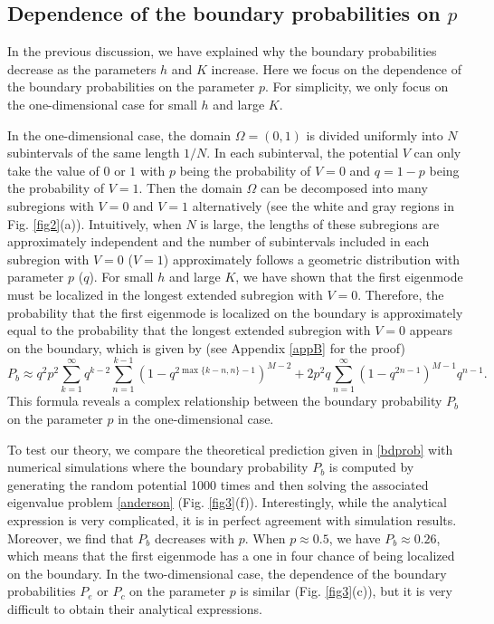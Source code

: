 \documentclass[a4paper,11pt]{article}
\begin{document}
\subsection{Dependence of the boundary probabilities on $p$}
In the previous discussion, we have explained why the boundary probabilities decrease as the parameters $h$ and $K$ increase. Here we focus on the dependence of the boundary probabilities on the parameter $p$. For simplicity, we only focus on the one-dimensional case for small $h$ and large $K$.

In the one-dimensional case, the domain $\Omega = (0, 1)$ is divided uniformly into $N$ subintervals of the same length $1/N$. In each subinterval, the potential $V$ can only take the value of $0$ or $1$ with $p$ being the probability of $V = 0$ and $q = 1-p$ being the probability of $V = 1$. Then the domain $\Omega$ can be decomposed into many subregions with $V = 0$ and $V = 1$ alternatively (see the white and gray regions in Fig. \ref{fig2}(a)). Intuitively, when $N$ is large, the lengths of these subregions are approximately independent and the number of subintervals included in each subregion with $V = 0$ ($V = 1$) approximately follows a geometric distribution with parameter $p$ ($q$). For small $h$ and large $K$, we have shown that the first eigenmode must be localized in the longest extended subregion with $V = 0$. Therefore, the probability that the first eigenmode is localized on the boundary is approximately equal to the probability that the longest extended subregion with $V = 0$ appears on the boundary, which is given by (see Appendix \ref{appB} for the proof)
\begin{equation}\label{bdprob}
P_b \approx q^2 p^2 \sum_{k=1}^{\infty} q^{k-2} \sum_{n=1}^{k-1} (1 - q^{2 \max\{k-n,n\}-1})^{M-2} + 2 p^2 q \sum_{n=1}^{\infty} (1-q^{2n-1})^{M-1} q^{n-1}.
\end{equation}
This formula reveals a complex relationship between the boundary probability $P_b$ on the parameter $p$ in the one-dimensional case.

To test our theory, we compare the theoretical prediction given in \eqref{bdprob} with numerical simulations where the boundary probability $P_b$ is computed by generating the random potential 1000 times and then solving the associated eigenvalue problem \eqref{anderson} (Fig. \ref{fig3}(f)). Interestingly, while the analytical expression is very complicated, it is in perfect agreement with simulation results. Moreover, we find that $P_b$ decreases with $p$. When $p\approx 0.5$, we have $P_b\approx 0.26$, which means that the first eigenmode has a one in four chance of being localized on the boundary. In the two-dimensional case, the dependence of the boundary probabilities $P_e$ or $P_c$ on the parameter $p$ is similar (Fig. \ref{fig3}(c)), but it is very difficult to obtain their analytical expressions.
\end{document}
